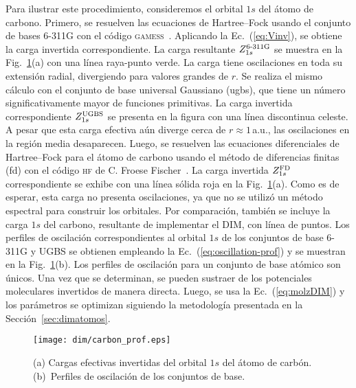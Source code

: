 Para ilustrar este procedimiento, consideremos el orbital $1s$ del átomo 
de carbono. Primero, se resuelven las ecuaciones de Hartree--Fock usando 
el conjunto de bases \mbox{6-311G} con el código 
\textsc{gamess}~\cite{Schmidt:93,Gordon:05}. Aplicando la 
Ec.~(\ref{eq:Vinv}), se obtiene la carga invertida correspondiente. La 
carga resultante $Z_{1s}^{\mbox{\scriptsize 6-311G}}$ se muestra en la 
Fig.~\ref{fig:1sCarbon}(a) con una línea raya-punto verde. La carga 
tiene oscilaciones en toda su extensión radial, divergiendo para valores 
grandes de $r$. Se realiza el mismo cálculo con el conjunto de base 
universal Gaussiano (\acs{ugbs}), que tiene un número significativamente 
mayor de funciones primitivas. La carga invertida correspondiente 
$Z_{1s}^{\mbox{\scriptsize UGBS}}$ se presenta en la figura con una 
línea discontinua celeste. A pesar que esta carga efectiva aún diverge 
cerca de $r\approx1\,$a.u., las oscilaciones en la región media 
desaparecen. Luego, se resuelven las ecuaciones diferenciales de 
Hartree--Fock para el átomo de carbono usando el método de diferencias 
finitas (\acs{fd}) con el código \textsc{hf} de C. Froese 
Fischer~\cite{FroeseFischer:97}. La carga invertida 
$Z_{1s}^{\mbox{\scriptsize FD}}$ correspondiente se exhibe con una línea 
sólida roja en la Fig.~\ref{fig:1sCarbon}(a). Como es de esperar, esta 
carga no presenta oscilaciones, ya que no se utilizó un método espectral 
para construir los orbitales. Por comparación, también se incluye la 
carga $1s$ del carbono, resultante de implementar el DIM, con línea de 
puntos. Los perfiles de oscilación correspondientes al orbital $1s$ de 
los conjuntos de base \mbox{6-311G} y UGBS se obtienen empleando la 
Ec.~(\ref{eq:oscillation-prof}) y se muestran en la 
Fig.~\ref{fig:1sCarbon}(b). Los perfiles de oscilación para un conjunto 
de base atómico son únicos. Una vez que se determinan, se pueden 
sustraer de los potenciales moleculares invertidos de manera directa. 
Luego, se usa la Ec.~(\ref{eq:molzDIM}) y los parámetros se optimizan 
siguiendo la metodología presentada en la Sección~\ref{sec:dimatomos}.

\begin{figure}[t]
\centering
\texttt{[image: dim/carbon\_prof.eps]}
\caption[Inversión de orbitales descriptos con conjuntos de base 
finitos.]
{(a) Cargas efectivas invertidas del orbital $1s$ del átomo de carbón.
(b)~Perfiles de oscilación de los conjuntos de base.}
\label{fig:1sCarbon}
\end{figure}

